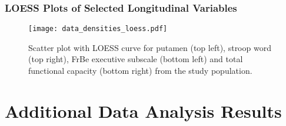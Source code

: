 \subsubsection{LOESS Plots of Selected Longitudinal Variables}

\begin{figure}[H]
\centering
\texttt{[image: data\_densities\_loess.pdf]}
\caption{Scatter plot with LOESS curve for {putamen (top left)}, {stroop word (top right)}, {FrBe executive subscale (bottom left)} and {total functional capacity (bottom right)} from the study population.}
\label{fig:data_densities}
\end{figure}

\singlespacing
\section{Additional Data Analysis Results}\label{sec:appendix_realdata}
